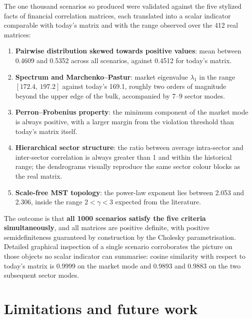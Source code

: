 \documentclass[11pt,a4paper]{article}
\begin{document}
The one thousand scenarios so produced were validated against the five
stylized facts of financial correlation matrices, each translated into a
scalar indicator comparable with today's matrix and with the range observed
over the 412 real matrices:

\begin{enumerate}[leftmargin=1.4em,itemsep=0.2em,topsep=0.35em]
  \item \textbf{Pairwise distribution skewed towards positive values}: mean
        between 0.4609 and 0.5352 across all scenarios, against 0.4512 for
        today's matrix.
  \item \textbf{Spectrum and Marchenko--Pastur}: market eigenvalue $\lambda_1$
        in the range $[172.4,\ 197.2]$ against today's 169.1, roughly two
        orders of magnitude beyond the upper edge of the bulk, accompanied by
        7--9 sector modes.
  \item \textbf{Perron--Frobenius property}: the minimum component of the
        market mode is always positive, with a larger margin from the violation
        threshold than today's matrix itself.
  \item \textbf{Hierarchical sector structure}: the ratio between average
        intra-sector and inter-sector correlation is always greater than 1 and
        within the historical range; the dendrograms visually reproduce the
        same sector colour blocks as the real matrix.
  \item \textbf{Scale-free MST topology}: the power-law exponent lies between
        2.053 and 2.306, inside the range $2 < \gamma < 3$ expected from the
        literature.
\end{enumerate}

The outcome is that \textbf{all 1000 scenarios satisfy the five criteria
simultaneously}, and all matrices are positive definite, with positive semidefiniteness guaranteed by
construction by the Cholesky parametrisation. Detailed graphical inspection of
a single scenario corroborates the picture on those objects no scalar indicator can
summarise: cosine similarity with respect to today's matrix is 0.9999 on the
market mode and 0.9893 and 0.9883 on the two subsequent sector modes.

\section{Limitations and future work}
\end{document}
